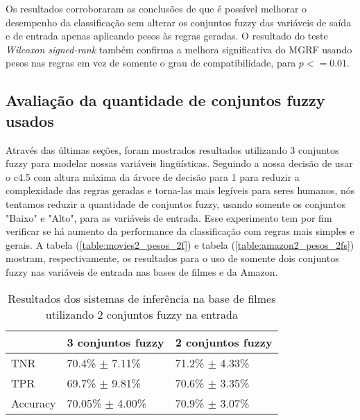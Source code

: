 %
%
%

Os resultados corroboraram as conclusões de \cite{ishibuchi2001effect} que é possível melhorar o desempenho da classificação sem alterar os conjuntos fuzzy das variáveis de saída e de entrada apenas aplicando pesos às regras geradas. O resultado do teste \textit{Wilcoxon signed-rank} também confirma a melhora significativa do MGRF usando pesos nas regras em vez de somente o grau de compatibilidade, para $p <= 0.01$.

\subsection{Avaliação da quantidade de conjuntos fuzzy usados}

Através das últimas seções, foram mostrados resultados utilizando 3 conjuntos fuzzy para modelar nossas variáveis lingüísticas. Seguindo a nossa decisão de usar o c4.5 com altura máxima da árvore de decisão para 1 para reduzir a complexidade das regras geradas e torna-las mais legíveis para seres humanos, nós tentamos reduzir a quantidade de conjuntos fuzzy, usando somente os conjuntos "Baixo" e "Alto", para as variáveis de entrada. Esse experimento tem por fim verificar se há aumento da performance da classificação com regras mais simples e gerais. A tabela (\ref{table:movies2_pesos_2f}) e tabela (\ref{table:amazon2_pesos_2fs}) mostram, respectivamente, os resultados para o uso de somente dois conjuntos fuzzy nas variáveis de entrada nas bases de filmes e da Amazon.

\begin{table}[!h]
    \begin{tabular}{lll}
    ~         			& 3 conjuntos fuzzy 							& 2 conjuntos fuzzy \\ \hline
    TNR 		  		& 70.4\% $\pm$ 7.11\%         			& 71.2\% $\pm$ 4.33\%    \\
    TPR    		 	& 69.7\% $\pm$ 9.81\%        			& 70.6\% $\pm$ 3.35\%   \\
    Accuracy  	 	& 70.05\% $\pm$ 4.00\%    			& 70.9\% $\pm$ 3.07\%    \\
    \end{tabular}
    \caption{Resultados dos sistemas de inferência na base de filmes utilizando 2 conjuntos fuzzy na entrada}
	\label{table:movies2_pesos_2fs}
\end{table}

